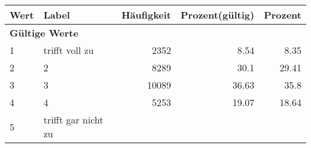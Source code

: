      \begin{longtable}{lXrrr}
     \toprule
     \textbf{Wert} & \textbf{Label} & \textbf{Häufigkeit} & \textbf{Prozent(gültig)} & \textbf{Prozent} \\
     \endhead
     \midrule
     \multicolumn{5}{l}{\textbf{Gültige Werte}}\\

     1 &
     \multicolumn{1}{X}{ trifft voll zu   } &


       \num{2352} &
       \num[round-mode=places,round-precision=2]{8.54} &
         \num[round-mode=places,round-precision=2]{8.35} \\

     2 &
     \multicolumn{1}{X}{ 2   } &


       \num{8289} &
       \num[round-mode=places,round-precision=2]{30.1} &
         \num[round-mode=places,round-precision=2]{29.41} \\

     3 &
     \multicolumn{1}{X}{ 3   } &


       \num{10089} &
       \num[round-mode=places,round-precision=2]{36.63} &
         \num[round-mode=places,round-precision=2]{35.8} \\

     4 &
     \multicolumn{1}{X}{ 4   } &


       \num{5253} &
       \num[round-mode=places,round-precision=2]{19.07} &
         \num[round-mode=places,round-precision=2]{18.64} \\

     5 &
     \multicolumn{1}{X}{ trifft gar nicht zu   } &



\end{longtable}

